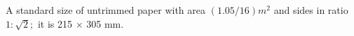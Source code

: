 A standard size of untrimmed paper with area $(1.05/16)m^{2}$  and sides in ratio
$ 1 : \sqrt{2} ; $ it is  215 \ensuremath{ \times } 305   mm.